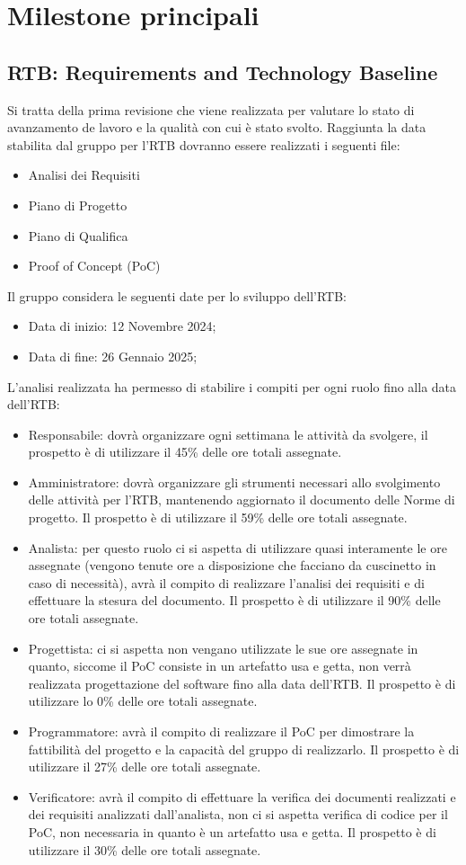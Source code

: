 \section{Milestone principali}
\label{sec:milestone_principali}
\subsection{RTB: Requirements and Technology Baseline}
Si tratta della prima revisione che viene realizzata per valutare lo stato di avanzamento de lavoro e la qualità con cui è stato svolto.
Raggiunta la data stabilita dal gruppo per l'RTB dovranno essere realizzati i seguenti file:

\begin{itemize}
\item Analisi dei Requisiti
\item Piano di Progetto
\item Piano di Qualifica
\item Proof of Concept (PoC)
\end{itemize}
Il gruppo considera le seguenti date per lo sviluppo dell'RTB:
\begin{itemize}
    \item Data di inizio: 12 Novembre 2024;
    \item Data di fine: 26 Gennaio 2025;
\end{itemize}
L'analisi realizzata ha permesso di stabilire i compiti per ogni ruolo fino alla data dell'RTB:
\begin{itemize}
\item Responsabile: dovrà organizzare ogni settimana le attività da svolgere, il prospetto è di utilizzare il 45\% delle ore totali assegnate.
\item Amministratore: dovrà organizzare gli strumenti necessari allo svolgimento delle attività per l'RTB, mantenendo aggiornato il documento delle Norme di progetto.
Il prospetto è di utilizzare il 59\% delle ore totali assegnate.
\item Analista: per questo ruolo ci si aspetta di utilizzare quasi interamente le ore assegnate (vengono tenute ore a disposizione che facciano da cuscinetto in caso di necessità), avrà il compito di realizzare l'analisi dei requisiti e di effettuare la stesura del documento.
Il prospetto è di utilizzare il 90\% delle ore totali assegnate.
\item Progettista: ci si aspetta non vengano utilizzate le sue ore assegnate in quanto, siccome il PoC consiste in un artefatto usa e getta, non verrà realizzata progettazione del software fino alla data dell'RTB.
Il prospetto è di utilizzare lo 0\% delle ore totali assegnate.
\item Programmatore: avrà il compito di realizzare il PoC per dimostrare la fattibilità del progetto e la capacità del gruppo di realizzarlo.
Il prospetto è di utilizzare il 27\% delle ore totali assegnate.
\item Verificatore: avrà il compito di effettuare la verifica dei documenti realizzati e dei requisiti analizzati dall'analista, non ci si aspetta verifica di codice per il PoC, non necessaria in quanto è un artefatto usa e getta.
Il prospetto è di utilizzare il 30\% delle ore totali assegnate.
\end{itemize}
